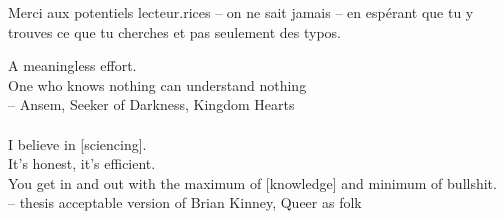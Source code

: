 \medskip

Merci aux potentiels lecteur.rices -- on ne sait jamais -- en espérant que tu y trouves ce que tu cherches et pas seulement des typos.

\bigskip
\vspace{8cm}

\begin{myepigraph}
A meaningless effort. \\ One who knows nothing can understand nothing \\ -- Ansem, Seeker of Darkness, Kingdom Hearts \\\\[1.5ex]%
I believe in [sciencing].\\ It's honest, it's efficient. \\ You get in and out with the maximum of [knowledge] and minimum of bullshit. \\ -- thesis acceptable version of Brian Kinney, Queer as folk
\end{myepigraph}
